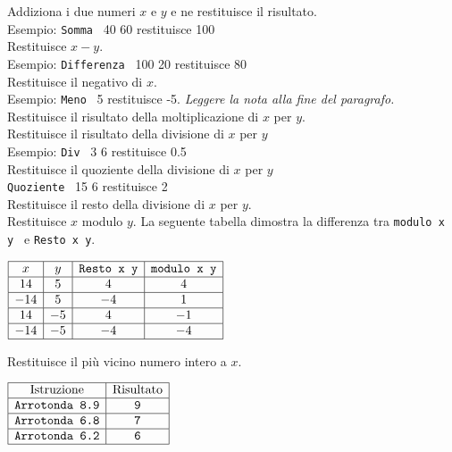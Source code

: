  Addiziona i due numeri $x$ e $y$ e ne restituisce il risultato.\\
 Esempio: \texttt{Somma} \ 40 60 restituisce 100\\
 Restituisce $x-y$.\\
 Esempio: \texttt{Differenza} \ 100 20 restituisce 80\\
 Restituisce il negativo di $x$. \\
Esempio: \texttt{Meno} \ 5 restituisce -5. \emph{Leggere la nota alla fine del paragrafo.}\\
 Restituisce il risultato della moltiplicazione di $x$ per $y$.\\
 Restituisce il risultato della divisione di $x$ per $y$\\
 Esempio: \texttt{Div} \ 3 6 restituisce 0.5\\
Restituisce il quoziente della divisione di $x$ per $y$\\
 \texttt{Quoziente} \ 15 6 restituisce 2\\
 Restituisce il resto della divisione di $x$ per $y$.\\
 Restituisce $x$ modulo $y$. 
La seguente tabella dimostra la differenza tra \texttt{modulo x y } e \texttt{Resto x y}.\\
\begin{center}
	$\begin{array}{|c|c|c|c|}
	\hline
	x & y & \textrm{\texttt{Resto x y}} & \textrm{\texttt{modulo x y}} \\
	\hline
	14 & 5 & 4& 4\\
	\hline
	-14 & 5 &-4 & 1\\
	\hline
	14 & -5 & 4 & -1\\
	\hline
	-14 & -5 & -4 & -4 \\
	\hline
\end{array}
$
\end{center}
Restituisce il più vicino numero intero a $x$.\\
\begin{center}
$\begin{array}{|c|c|}
	\hline \textrm{Istruzione} & \textrm{Risultato} \\ \hline
	\texttt{Arrotonda 8.9} 		& \texttt{9}\\
	\hline
	\texttt{Arrotonda 6.8} 		& \texttt{7} \\
	\hline
	\texttt{Arrotonda 6.2} 		& \texttt{6} \\
	\hline
\end{array}$
\end{center}
